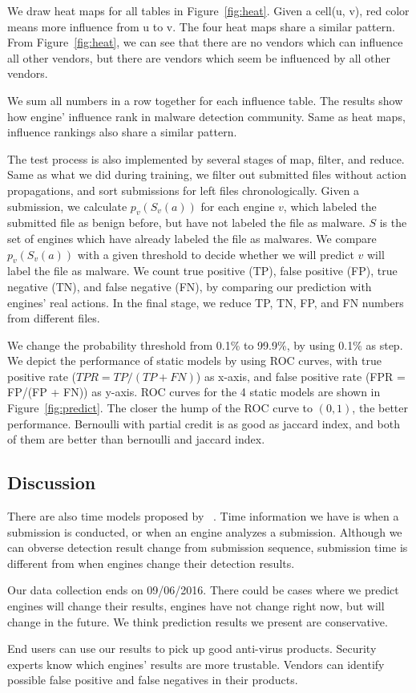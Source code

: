 

We draw heat maps for all tables in Figure~\ref{fig:heat}. 
Given a cell(u, v), red color means more influence from u to v. 
The four heat maps share a similar pattern.
From Figure~\ref{fig:heat}, 
we can see that there are no vendors which can influence all other vendors, 
but there are vendors which seem be influenced by all other vendors.  

We sum all numbers in a row together for each influence table. 
The results show how engine' influence rank in malware detection community. 
Same as heat maps, influence rankings also share a similar pattern. 

The test process is also implemented by several stages of map, filter, and reduce. 
Same as what we did during training, 
we filter out submitted files without action propagations, 
and sort submissions for left files chronologically. 
Given a submission, we calculate $p_v(S_v(a))$ for each engine $v$, 
which labeled the submitted file as benign before, but have not labeled the file as malware. 
$S$ is the set of engines which have already labeled the file as malwares.
We compare $p_v(S_v(a))$ with a given threshold to decide whether we will predict 
$v$ will label the file as malware. We count true positive (TP), false positive (FP), true negative (TN), 
and false negative (FN), by comparing our prediction with engines' real actions. 
In the final stage, we reduce TP, TN, FP, and FN numbers from different files.




We change the probability threshold from 0.1\% to 99.9\%, by using 0.1\% as step. 
We depict the performance of static models by using ROC curves, 
with true positive rate ($TPR = TP/(TP+FN)$) as x-axis, 
and false positive rate (FPR = FP/(FP + FN)) as y-axis. 
ROC curves for the 4 static models are shown in Figure~\ref{fig:predict}. 
The closer the hump of the ROC curve to $(0,1)$, the better performance.
Bernoulli with partial credit is as good as jaccard index, 
and both of them are better than bernoulli and jaccard index. 


\subsection{Discussion}

There are also time models proposed by ~\citet{Influence}. 
Time information we have is when a submission is conducted, or when an engine analyzes a submission. 
Although we can obverse detection result change from submission sequence, 
submission time is different from when engines change their detection results. 

Our data collection ends on 09/06/2016. 
There could be cases where we predict engines will change their results, 
engines have not change right now, but will change in the future.  
We think prediction results we present are conservative. 

End users can use our results to pick up good anti-virus products. 
Security experts know which engines’ results are more trustable. 
Vendors can identify possible false positive and false negatives in their products. 
